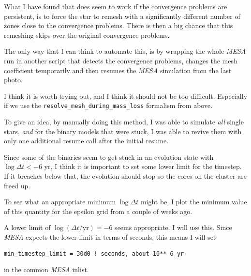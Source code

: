 \documentclass[a4paper,10pt]{article}
\begin{document}
What I have found that does seem to work if the convergence problems are persistent, is to force the star to remesh with a significantly different number of zones close to the convergence problems. There is then a big chance that this remeshing skips over the original convergence problems.

The only way that I can think to automate this, is by wrapping the whole \emph{MESA} run in another script that detects the convergence problems, changes the mesh coefficient temporarily and then resumes the \emph{MESA} simulation from the last photo.

I think it is worth trying out, and I think it should not be too difficult. Especially if we use the \lstinline[style=output, breaklines=true]|resolve_mesh_during_mass_loss| formalism from above.

To give an idea, by manually doing this method, I was able to simulate \emph{all} single stars, \emph{and} for the binary models that were stuck, I was able to revive them with only one additional resume call after the initial resume.


Since some of the binaries seem to get stuck in an evolution state with \(\log \Delta t < -6 \text{ yr}\), I think it is important to set some lower limit for the timestep. If it breaches below that, the evolution should stop so the cores on the cluster are freed up.

To see what an appropriate minimum \(\log \Delta t\) might be, I plot the minimum value of this quantity for the epsilon grid from a couple of weeks ago.

\begin{figure}[ht]
    \centering
\end{figure}

A lower limit of \(\log (\Delta t / \text{yr}) = -6 \) seems appropriate. I will use this. Since \emph{MESA} expects the lower limit in terms of seconds, this means I will set 
\begin{verbatim}
min_timestep_limit = 30d0 ! seconds, about 10**-6 yr
\end{verbatim}
in the common \emph{MESA} inlist.
\end{document}
